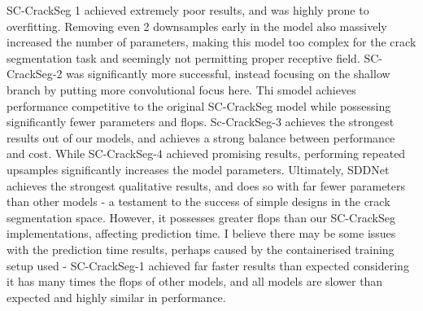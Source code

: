 \documentclass[a4paper,12pt]{report}
\begin{document}
SC-CrackSeg 1 achieved extremely poor results, and was highly prone to overfitting. Removing even 2 downsamples early in the model also massively increased the number of parameters, making this model too complex for the crack segmentation task and seemingly not permitting proper receptive field. SC-CrackSeg-2 was significantly more successful, instead focusing on the shallow branch by putting more convolutional focus here. Thi smodel achieves performance competitive to the original SC-CrackSeg model while possessing significantly fewer parameters and flops. Sc-CrackSeg-3 achieves the strongest results out of our models, and achieves a strong balance between performance and cost. While SC-CrackSeg-4 achieved promising results, performing repeated upsamples significantly increases the model parameters. Ultimately, SDDNet achieves the strongest qualitative results, and does so with far fewer parameters than other models - a testament to the success of simple designs in the crack segmentation space. However, it possesses greater flops than our SC-CrackSeg implementations, affecting prediction time. I believe there may be some issues with the prediction time results, perhaps caused by the containerised training setup used - SC-CrackSeg-1 achieved far faster results than expected considering it has many times the flops of other models, and all models are slower than expected and highly similar in performance.
\end{document}
